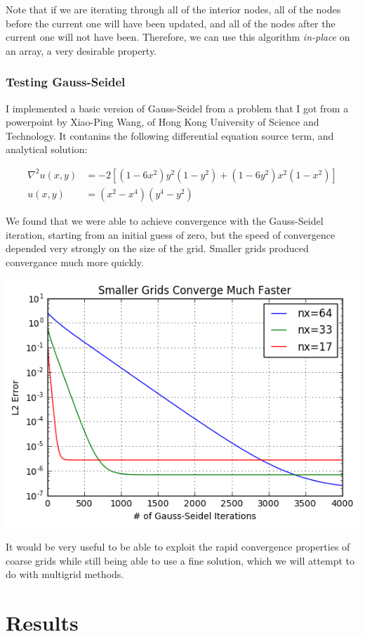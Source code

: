 \documentclass[11pt]{article}
\begin{document}
Note that if we are iterating through all of the interior nodes,
	all of the nodes before the current one will have been updated,
	and all of the nodes after the current one will not have been.
Therefore, we can use this algorithm \emph{in-place} on an array,
	a very desirable property.

\subsubsection{Testing Gauss-Seidel}

I implemented a basic version of Gauss-Seidel from a problem that I got from
	a powerpoint by Xiao-Ping Wang, of Hong Kong University of Science
	and Technology.
It contanins the following differential equation source term, and analytical solution:

\begin{align}
	\nabla^2 u(x,y) & = -2 \left[ (1 - 6 x^2) y^2 (1-y^2) + (1-6y^2)x^2(1-x^2) \right]\\
	u(x,y) & = (x^2 - x^4)(y^4-y^2)
\end{align}

We found that we were able to achieve convergence with the Gauss-Seidel iteration,
	starting from an initial guess of zero,
	but the speed of convergence depended very strongly on the size of the grid.
Smaller grids produced convergance much more quickly.

\includegraphics[width=\textwidth]{gauss-seidel-error-decreasing}

It would be very useful to be able to exploit the rapid convergence properties
	of coarse grids while still being able to use a fine solution,
	which we will attempt to do with multigrid methods.
	
\section{Results}
\end{document}
